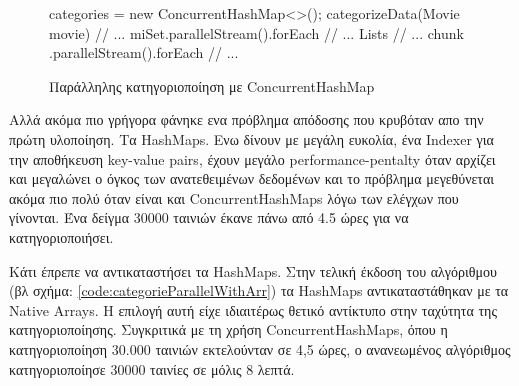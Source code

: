 \begin{figure}[h]
    \begin{javacode}
    categories = new ConcurrentHashMap<>();
    categorizeData(Movie movie) { // ...
        miSet.parallelStream().forEach // ...
    }
    Lists
      // ...
         chunk
            .parallelStream().forEach // ...
      
    \end{javacode}
    \caption{Παράλληλης κατηγοριοποίηση με ConcurrentHashMap}
   \label{code:categorieParallelWithCHM}
\end{figure}

Αλλά ακόμα πιο γρήγορα φάνηκε ενα πρόβλημα απόδοσης που κρυβόταν απο την 
πρώτη υλοποίηση. Τα HashMaps. 
Ενω δίνουν με μεγάλη ευκολία, ένα Indexer για την αποθήκευση key-value pairs, έχουν μεγάλο performance-pentalty όταν αρχίζει και μεγαλώνει ο όγκος των ανατεθειμένων δεδομένων και το πρόβλημα μεγεθύνεται ακόμα πιο πολύ όταν είναι και ConcurrentHashMaps λόγω των ελέγχων που γίνονται. Ένα δείγμα 30000 ταινιών έκανε πάνω από 4.5 ώρες για να κατηγοριοποιήσει.

Κάτι έπρεπε να αντικαταστήσει τα HashMaps. Στην τελική έκδοση του αλγόριθμου (βλ σχήμα: \ref{code:categorieParallelWithArr}) τα HashMaps αντικαταστάθηκαν με τα Native Arrays. Η επιλογή αυτή είχε ιδιαιτέρως θετικό αντίκτυπο στην ταχύτητα της κατηγοριοποίησης.
Συγκριτικά με τη χρήση ConcurrentHashMaps, όπου η κατηγοριοποίηση 30.000 ταινιών εκτελούνταν σε 4,5 ώρες, ο ανανεωμένος αλγόριθμος κατηγοριοποίησε 30000 ταινίες σε μόλις 8 λεπτά. 

